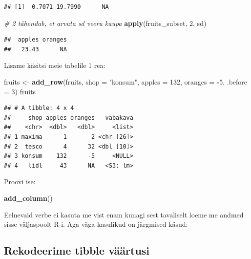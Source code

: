 \documentclass[]{book}
\newenvironment{Shaded}{\begin{snugshade}}{\end{snugshade}}
\newcommand{\KeywordTok}[1]{\textcolor[rgb]{0.13,0.29,0.53}{\textbf{#1}}}
\newcommand{\DataTypeTok}[1]{\textcolor[rgb]{0.13,0.29,0.53}{#1}}
\newcommand{\DecValTok}[1]{\textcolor[rgb]{0.00,0.00,0.81}{#1}}
\newcommand{\StringTok}[1]{\textcolor[rgb]{0.31,0.60,0.02}{#1}}
\newcommand{\CommentTok}[1]{\textcolor[rgb]{0.56,0.35,0.01}{\textit{#1}}}
\newcommand{\OperatorTok}[1]{\textcolor[rgb]{0.81,0.36,0.00}{\textbf{#1}}}
\newcommand{\NormalTok}[1]{#1}
\begin{document}
\begin{verbatim}
## [1]  0.7071 19.7990      NA
\end{verbatim}

\begin{Shaded}
\begin{Highlighting}[]
\CommentTok{# 2 tähendab, et arvuta sd veeru kaupa}
\KeywordTok{apply}\NormalTok{(fruits_subset, }\DecValTok{2}\NormalTok{, sd) }
\end{Highlighting}
\end{Shaded}

\begin{verbatim}
##  apples oranges 
##   23.43      NA
\end{verbatim}

Lisame käsitsi meie tabelile 1 rea:

\begin{Shaded}
\begin{Highlighting}[]
\NormalTok{fruits <-}\StringTok{ }\KeywordTok{add_row}\NormalTok{(fruits, }
                  \DataTypeTok{shop =} \StringTok{"konsum"}\NormalTok{, }
                  \DataTypeTok{apples =} \DecValTok{132}\NormalTok{, }
                  \DataTypeTok{oranges =} \OperatorTok{-}\DecValTok{5}\NormalTok{, }
                  \DataTypeTok{.before =} \DecValTok{3}\NormalTok{)}
\NormalTok{fruits}
\end{Highlighting}
\end{Shaded}

\begin{verbatim}
## # A tibble: 4 x 4
##     shop apples oranges   vabakava
##    <chr>  <dbl>   <dbl>     <list>
## 1 maxima      1       2 <chr [26]>
## 2  tesco      4      32 <dbl [10]>
## 3 konsum    132      -5     <NULL>
## 4   lidl     43      NA   <S3: lm>
\end{verbatim}

Proovi ise:

\begin{Shaded}
\begin{Highlighting}[]
\KeywordTok{add_column}\NormalTok{()}
\end{Highlighting}
\end{Shaded}

Eelnevaid verbe ei kasuta me vist enam kunagi sest tavaliselt loeme me
andmed sisse väljaspoolt R-i. Aga väga kasulikud on järgmised käsud:

\subsection{Rekodeerime tibble
väärtusi}\label{rekodeerime-tibble-vaartusi}
\end{document}
